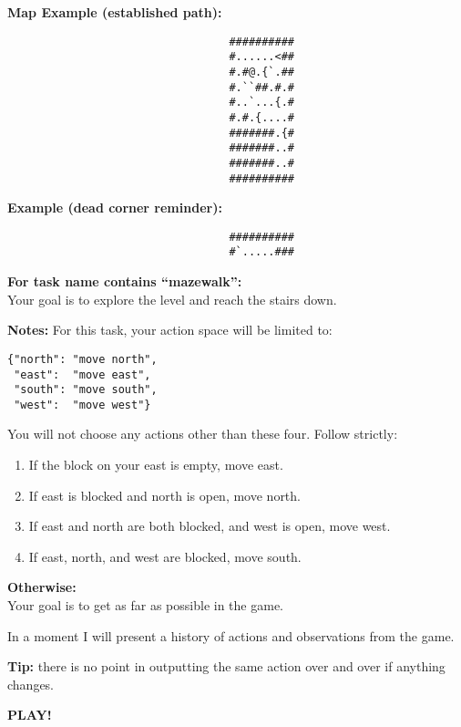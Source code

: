 \begin{MyGreenBox}[frametitle={\textbf{Iteration 1 MiniHack Prompt}}]
\textbf{Map Example (established path):}
\begin{verbatim}
                                  ##########
                                  #......<##
                                  #.#@.{`.##
                                  #.``##.#.#
                                  #..`...{.#
                                  #.#.{....#
                                  #######.{#
                                  #######..#
                                  #######..#
                                  ##########
\end{verbatim}

\textbf{Example (dead corner reminder):}
\begin{verbatim}
                                  ##########
                                  #`.....###
\end{verbatim}

\textbf{For task name contains “mazewalk”:}\\
Your goal is to explore the level and reach the stairs down.

\textbf{Notes:}
For this task, your action space will be limited to:
\begin{verbatim}
{"north": "move north",
 "east":  "move east",
 "south": "move south",
 "west":  "move west"}
\end{verbatim}

You will not choose any actions other than these four. Follow strictly:
\begin{enumerate}
  \item If the block on your east is empty, move east.
  \item If east is blocked and north is open, move north.
  \item If east and north are both blocked, and west is open, move west.
  \item If east, north, and west are blocked, move south.
\end{enumerate}

\textbf{Otherwise:}\\
Your goal is to get as far as possible in the game.

In a moment I will present a history of actions and observations from the game.

\textbf{Tip:} there is no point in outputting the same action over and over if anything changes.

\textbf{PLAY!}
\end{MyGreenBox}

